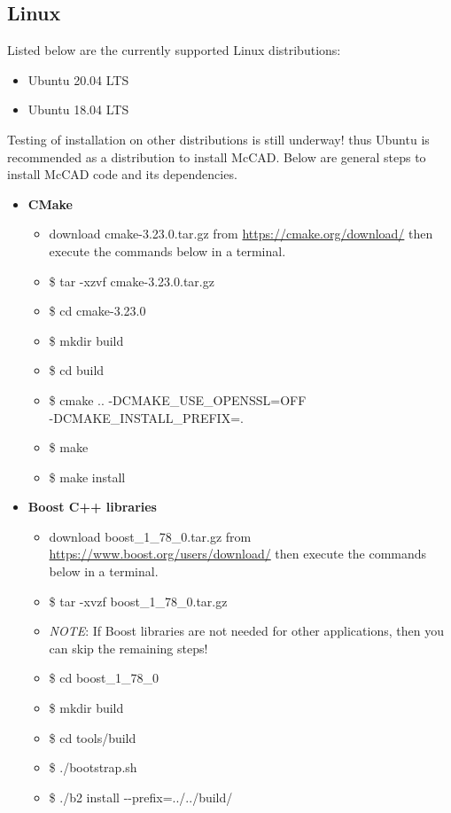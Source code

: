 \documentclass[12pt, a4paper, titlepage]{article}
\begin{document}
  \subsection{Linux}
    Listed below are the currently supported Linux distributions:
    \begin{itemize}
  	  \item Ubuntu 20.04 LTS
  	  \item Ubuntu 18.04 LTS
    \end{itemize} 
    Testing of installation on other distributions is still underway! thus Ubuntu is recommended as a distribution to install McCAD. Below are general steps to install McCAD code and its dependencies.
    \begin{itemize}
  	  \item \textbf{CMake}
  	  \begin{itemize}
		\item download cmake-3.23.0.tar.gz from \url{https://cmake.org/download/} then execute the commands below in a terminal.
		\item \$ tar -xzvf cmake-3.23.0.tar.gz
		\item \$ cd cmake-3.23.0
		\item \$ mkdir build
		\item \$ cd build
		\item \$ cmake .. -DCMAKE\_USE\_OPENSSL=OFF \\-DCMAKE\_INSTALL\_PREFIX=.
		\item \$ make
		\item \$ make install
  	  \end{itemize}
      \item \textbf{Boost C++ libraries}
      \begin{itemize}
    	\item download boost\_1\_78\_0.tar.gz from \url{https://www.boost.org/users/download/} then execute the commands below in a terminal.
    	\item \$ tar -xvzf boost\_1\_78\_0.tar.gz
    	\item \emph{NOTE}: If Boost libraries are not needed for other applications, then you can skip the remaining steps!
    	\item \$ cd boost\_1\_78\_0
    	\item \$ mkdir build
    	\item \$ cd tools/build
    	\item \$ ./bootstrap.sh
    	\item \$ ./b2 install -\--prefix=../../build/
      \end{itemize}

\end{itemize}
\end{document}
